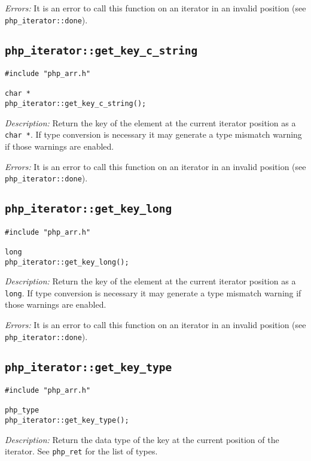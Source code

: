 \documentclass[11pt,titlepage]{article}
\begin{document}
\emph{Errors:} It is an error to call this function on an iterator in an invalid position (see \verb|php_iterator::done|).


\subsection{\texttt{php\_iterator::get\_key\_c\_string}}

\begin{verbatim}
#include "php_arr.h"

char *
php_iterator::get_key_c_string();
\end{verbatim}

\emph{Description:} Return the key of the element at the current iterator position as a \verb|char *|. If type conversion is necessary it may generate a type mismatch warning if those warnings are enabled.

\emph{Errors:} It is an error to call this function on an iterator in an invalid position (see \verb|php_iterator::done|).


\subsection{\texttt{php\_iterator::get\_key\_long}}

\begin{verbatim}
#include "php_arr.h"

long 
php_iterator::get_key_long();
\end{verbatim}

\emph{Description:} Return the key of the element at the current iterator position as a \verb|long|. If type conversion is necessary it may generate a type mismatch warning if those warnings are enabled.

\emph{Errors:} It is an error to call this function on an iterator in an invalid position (see \verb|php_iterator::done|).


\subsection{\texttt{php\_iterator::get\_key\_type}}

\begin{verbatim}
#include "php_arr.h"

php_type 
php_iterator::get_key_type();
\end{verbatim}

\emph{Description:} Return the data type of the key at the current position of the iterator. See \verb|php_ret| for the list of types.
\end{document}
